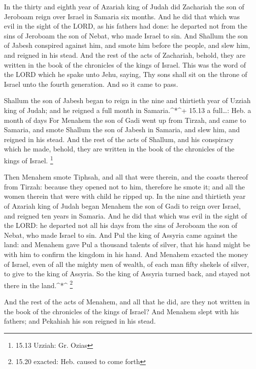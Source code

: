  In the thirty and eighth year of Azariah king of Judah did
Zachariah the son of Jeroboam reign over Israel in Samaria six months.
 And he did that which was evil in the sight of the LORD, as
his fathers had done: he departed not from the sins of Jeroboam the son
of Nebat, who made Israel to sin.  And Shallum the son of
Jabesh conspired against him, and smote him before the people, and slew
him, and reigned in his stead.  And the rest of the acts of
Zachariah, behold, they are written in the book of the chronicles of the
kings of Israel.  This was the word of the LORD which he
spake unto Jehu, saying, Thy sons shall sit on the throne of Israel unto
the fourth generation. And so it came to pass.

 Shallum the son of Jabesh began to reign in the nine and
thirtieth year of Uzziah king of Judah; and he reigned a full month in
Samaria.\^{}*\^{}+ 15.13 a full\ldots: Heb. a month of days
 For Menahem the son of Gadi went up from Tirzah, and came
to Samaria, and smote Shallum the son of Jabesh in Samaria, and slew
him, and reigned in his stead.  And the rest of the acts of
Shallum, and his conspiracy which he made, behold, they are written in
the book of the chronicles of the kings of Israel. \footnote{15.13
  Uzziah: Gr. Ozias}

 Then Menahem smote Tiphsah, and all that were therein, and
the coasts thereof from Tirzah: because they opened not to him,
therefore he smote it; and all the women therein that were with child he
ripped up.  In the nine and thirtieth year of Azariah king
of Judah began Menahem the son of Gadi to reign over Israel, and reigned
ten years in Samaria.  And he did that which was evil in
the sight of the LORD: he departed not all his days from the sins of
Jeroboam the son of Nebat, who made Israel to sin.  And Pul
the king of Assyria came against the land: and Menahem gave Pul a
thousand talents of silver, that his hand might be with him to confirm
the kingdom in his hand.  And Menahem exacted the money of
Israel, even of all the mighty men of wealth, of each man fifty shekels
of silver, to give to the king of Assyria. So the king of Assyria turned
back, and stayed not there in the land.\^{}*\^{} \footnote{15.20
  exacted: Heb. caused to come forth}

 And the rest of the acts of Menahem, and all that he did,
are they not written in the book of the chronicles of the kings of
Israel?  And Menahem slept with his fathers; and Pekahiah
his son reigned in his stead.

